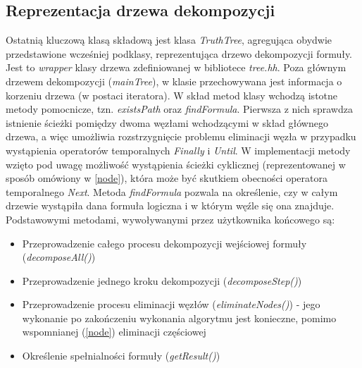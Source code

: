 \documentclass[12pt,a4paper,titlepage]{article}
\begin{document}
\subsection{Reprezentacja drzewa dekompozycji}
\label{tree}
Ostatnią kluczową klasą składową jest klasa \textit{TruthTree}, agregująca obydwie przedstawione wcześniej podklasy, reprezentująca drzewo dekompozycji formuły. Jest to \textit{wrapper} klasy drzewa zdefiniowanej w bibliotece \textit{tree.hh}. Poza głównym drzewem dekompozycji (\textit{mainTree}), w klasie przechowywana jest informacja o korzeniu drzewa (w postaci iteratora). W skład metod klasy wchodzą istotne metody pomocnicze, tzn. \textit{existsPath} oraz \textit{findFormula}. Pierwsza z nich sprawdza istnienie ścieżki pomiędzy dwoma węzłami wchodzącymi w skład głównego drzewa, a więc umożliwia rozstrzygnięcie problemu eliminacji węzła w przypadku wystąpienia operatorów temporalnych \textit{Finally} i \textit{Until}. W implementacji metody wzięto pod uwagę możliwość wystąpienia ścieżki cyklicznej (reprezentowanej w sposób omówiony w \ref{node}), która może być skutkiem obecności operatora temporalnego \textit{Next}. Metoda \textit{findFormula} pozwala na określenie, czy w całym drzewie wystąpiła dana formuła logiczna i w którym węźle się ona znajduje. Podstawowymi metodami, wywoływanymi przez użytkownika końcowego są:
\begin{itemize}
	\item Przeprowadzenie całego procesu dekompozycji wejściowej formuły (\textit{decomposeAll()})
	\item Przeprowadzenie jednego kroku dekompozycji (\textit{decomposeStep()})
	\item Przeprowadzenie procesu eliminacji węzłów (\textit{eliminateNodes()}) - jego wykonanie po zakończeniu wykonania algorytmu jest konieczne, pomimo wspomnianej (\ref{node}) eliminacji częściowej
	\item Określenie spełnialności formuły (\textit{getResult()})
\end{itemize}
\end{document}

